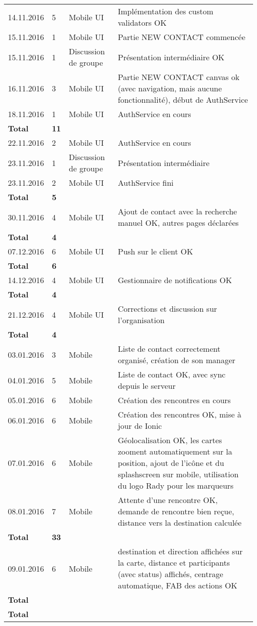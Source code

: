 \documentclass[french]{article}
\begin{document}
\begin{longtable}{p{}|p{}|p{}|p{}}
		\hline
		14.11.2016 & 5 & Mobile UI & Implémentation des custom validators OK\\
		15.11.2016 & 1 & Mobile UI & Partie NEW CONTACT commencée\\
		15.11.2016 & 1 & Discussion de groupe & Présentation intermédiaire OK\\
		16.11.2016 & 3 & Mobile UI & Partie NEW CONTACT canvas ok (avec navigation, mais aucune fonctionnalité), début de AuthService\\
		18.11.2016 & 1 & Mobile UI & AuthService en cours\\
		\textbf{Total} & \textbf{11} &&\\
		\hline
		22.11.2016 & 2 & Mobile UI & AuthService en cours\\
		23.11.2016 & 1 & Discussion de groupe & Présentation intermédiaire\\
		23.11.2016 & 2 & Mobile UI & AuthService fini\\
		\textbf{Total} & \textbf{5} &&\\
		\hline
		30.11.2016 & 4 & Mobile UI & Ajout de contact avec la recherche manuel OK, autres pages déclarées\\
		\textbf{Total} & \textbf{4} &&\\
		\hline
		07.12.2016 & 6 & Mobile UI & Push sur le client OK\\
		\textbf{Total} & \textbf{6} &&\\
		\hline
		14.12.2016 & 4 & Mobile UI & Gestionnaire de notifications OK\\
		\textbf{Total} & \textbf{4} &&\\
		\hline
		21.12.2016 & 4 & Mobile UI & Corrections et discussion sur l'organisation\\
		\textbf{Total} & \textbf{4} &&\\
		\hline
		03.01.2016 & 3 & Mobile & Liste de contact correctement organisé, création de son manager\\
		04.01.2016 & 5 & Mobile & Liste de contact OK, avec sync depuis le serveur\\
		05.01.2016 & 6 & Mobile & Création des rencontres en cours\\
		06.01.2016 & 6 & Mobile & Création des rencontres OK, mise à jour de Ionic\\
		07.01.2016 & 6 & Mobile & Géolocalisation OK, les cartes zooment automatiquement sur la position, ajout de l'icône et du splashscreen sur mobile, utilisation du logo Rady pour les marqueurs\\
		08.01.2016 & 7 & Mobile & Attente d'une rencontre OK, demande de rencontre bien reçue, distance vers la destination calculée\\
		\textbf{Total} & \textbf{33} &&\\
		\hline
		09.01.2016 & 6 & Mobile & destination et direction affichées sur la carte, distance et participants (avec status) affichés, centrage automatique, FAB des actions OK\\
		\textbf{Total} & \textbf{} &&\\
		\hline\hline
		\textbf{Total} & \textbf{} &&\\
	\end{longtable}
	
\end{document}
